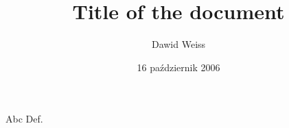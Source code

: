 \documentclass{dwdoc}
\author{Dawid Weiss}
\title{Title of the document}
\date{16 październik 2006}
\begin{document}
\maketitle

Abc Def.
\end{document}
